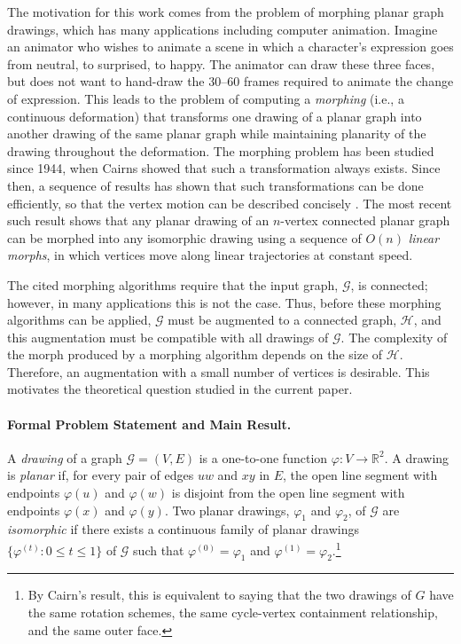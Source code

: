 \documentclass{patmorin}
\newcommand{\R}{\mathbb{R}}
\begin{document}
The motivation for this work comes from the problem of morphing
planar graph drawings, which has many applications \cite{erten.kobourov.ea:intersection,friedrich.eades:graph,gotsman.surazhsky:guaranteed,surazhsky.gotsman:controllable,surazhsky.gotsman:intrinsic} including
computer animation. Imagine an animator who wishes to animate a scene in which a character's expression
goes from neutral, to surprised, to happy. The animator can draw these
three faces, but does not want to hand-draw the 30--60 frames required
to animate the change of expression. This leads to the problem of computing a {\em morphing} (i.e., a continuous deformation) that transforms one drawing of a planar graph into
another drawing of the same planar graph while maintaining planarity
of the drawing throughout the deformation.
The morphing problem has been studied since 1944, when Cairns \cite{cairns:deformations}
showed that such a transformation always exists.  Since then, a sequence of results has shown
that such transformations can be done efficiently, so that the
vertex motion can be described concisely \cite{thomassen:deformations,
grunbaum.shephard:geometry,alamdari.angelini.ea:morphing,
angelini.dalozzo.ea:morphing}.  The most recent such result
\cite{angelini.dalozzo.ea:morphing} shows that any planar drawing of
an $n$-vertex connected planar graph can be morphed into any isomorphic
drawing using a sequence of $O(n)$ \emph{linear
morphs}, in which vertices move along linear trajectories at constant
speed.

The cited morphing algorithms require that the input graph, $\mathcal{G}$, is connected; however, in many applications this is not the case. Thus, before these morphing algorithms can be applied, $\mathcal{G}$ must be augmented to a connected graph, $\mathcal H$, and this augmentation must be compatible with all drawings of $\mathcal{G}$.  The complexity of the morph produced by a morphing algorithm depends on the size of $\mathcal H$.  Therefore, an augmentation with a small number of vertices is desirable. This motivates the theoretical question studied in the current paper.

\paragraph{Formal Problem Statement and Main Result.} A \emph{drawing}
of a graph $\mathcal{G}=(V,E)$ is a one-to-one function $\varphi\colon
V\to\R^2$.  A drawing is \emph{planar} if, for every pair of edges $uw$
and $xy$ in $E$, the open line segment with endpoints $\varphi(u)$
and $\varphi(w)$ is disjoint from the open line segment with endpoints
$\varphi(x)$ and $\varphi(y)$.  Two planar drawings, $\varphi_1$ and
$\varphi_2$, of $\mathcal{G}$ are \emph{isomorphic} if there exists
a continuous family of planar drawings $\{\varphi^{(t)} \colon 0\le
t\le 1\}$ of $\mathcal{G}$ such that $\varphi^{(0)}=\varphi_1$ and
$\varphi^{(1)}=\varphi_2$.\footnote{By Cairn's result, this is equivalent to
saying that the two drawings of $G$ have the same rotation schemes, the same
cycle-vertex containment relationship, and the same outer face.}
\end{document}
